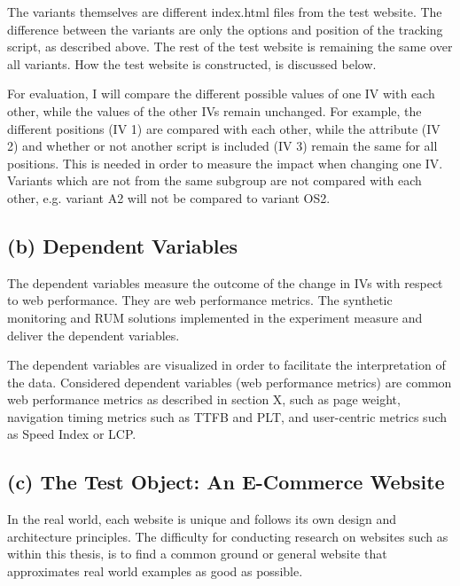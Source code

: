 
The variants themselves are different index.html files from the test website.
The difference between the variants are only the options and position of the tracking script, as described above.
The rest of the test website is remaining the same over all variants.
How the test website is constructed, is discussed below.


For evaluation, I will compare the different possible values of one IV with each other, while the values of the other IVs remain unchanged.
For example, the different positions (IV 1) are compared with each other, while the attribute (IV 2) and whether or not another script is included (IV 3) remain the same for all positions.
This is needed in order to measure the impact when changing one IV.
Variants which are not from the same subgroup are not compared with each other, e.g. variant A2 will not be compared to variant OS2.



\subsection{(b) Dependent Variables}

The dependent variables measure the outcome of the change in IVs with respect to web performance.
They are web performance metrics.
The synthetic monitoring and RUM solutions implemented in the experiment measure and deliver the dependent variables.

The dependent variables are visualized in order to facilitate the interpretation of the data.
Considered dependent variables (web performance metrics) are common web performance metrics as described in section X, such as page weight, navigation timing metrics such as TTFB and PLT, and user-centric metrics such as Speed Index or LCP.



\subsection{(c) The Test Object: An E-Commerce Website}


In the real world, each website is unique and follows its own design and architecture principles.
The difficulty for conducting research on websites such as within this thesis, is to find a common ground or general website that approximates real world examples as good as possible.

